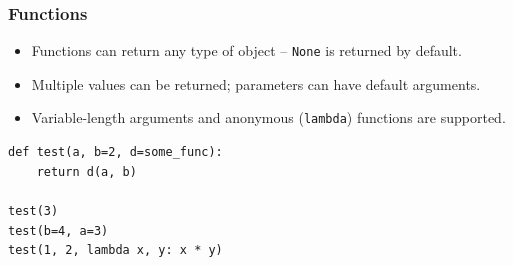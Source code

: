 
\begin{frame}[fragile]\frametitle{Functions}
	\begin{itemize}
	\item Functions can return any type of object -- \lstinline{None} is returned by default.
	\item Multiple values can be returned; parameters can have default arguments.
	\item Variable-length arguments and anonymous (\lstinline{lambda}) functions are supported.
	\end{itemize}
\begin{lstlisting}
def test(a, b=2, d=some_func):
    return d(a, b)

test(3)
test(b=4, a=3)
test(1, 2, lambda x, y: x * y)
\end{lstlisting}
\end{frame}

%


